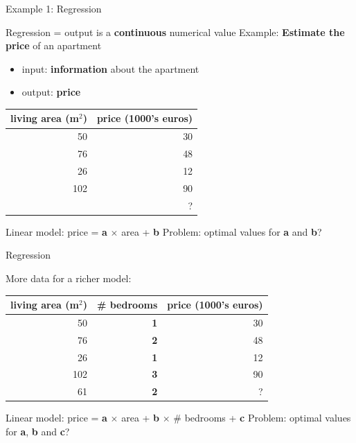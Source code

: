 \documentclass{beamer}
\begin{document}
\begin{frame}{Example 1: Regression}

Regression = output is a \textbf{continuous} numerical value
\vfill
Example: \textbf{Estimate the price} of an apartment
\begin{itemize}
	\item input: \textbf{information} about the apartment
	\item output: \textbf{price}
\end{itemize}
\vfill
\pause
\begin{table}
\centering
\begin{tabular}{r|r}
living area (m$^2$) & price (1000's euros) \\\hline
50 & 30 \\
76 & 48 \\
26 & 12 \\
102 & 90 \\
\pause
61 & ?
\end{tabular}
\end{table}
\vfill
Linear model: price = \textbf{a} $\times$ area + \textbf{b}
\vfill
Problem: optimal values for \textbf{a} and \textbf{b}?

\end{frame}

\begin{frame}{Regression}

More data for a richer model:
\vfill
\begin{table}
\centering
\begin{tabular}{r|r|r}
living area (m$^2$) &  \textbf{\# bedrooms} & price (1000's euros) \\\hline
50 & \textbf{1} & 30\\
76 & \textbf{2} & 48\\
26 & \textbf{1} & 12\\
102 & \textbf{3} & 90\\
61 & \textbf{2} & ?
\end{tabular}
\end{table}

\vfill
Linear model: price = \textbf{a} $\times$ area + \textbf{b} $\times$ \# bedrooms + \textbf{c}
\vfill
Problem: optimal values for \textbf{a}, \textbf{b} and \textbf{c}?
\end{frame}
\end{document}
